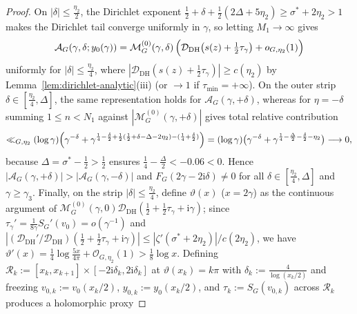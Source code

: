 \documentclass[11pt,a4paper,reqno]{amsart}
\theoremstyle{definition}
\theoremstyle{remark}
\numberwithin{equation}{section}
\newcommand{\ii}{\mathrm{i}}
\begin{document}
\begin{proof}
On $|\delta| \le \frac{\eta_2}{2}$, the Dirichlet exponent $\frac{1}{2} + \delta + \frac{1}{2}(2\Delta + 5\eta_2) \ge \sigma^* + 2\eta_2 > 1$ makes the Dirichlet tail converge uniformly in $\gamma$, so letting $M_1 \to \infty$ gives
\begin{equation*}
  \mathcal{A}_G(\gamma, \delta; y_0(\gamma))
  = \mathcal{M}_G^{(0)}(\gamma, \delta)\,\Bigl(\mathcal{D}_{\mathrm{DH}}\!\left(s(z) + \tfrac{1}{2}\tau_\gamma\right) + o_{G,\eta_2}(1)\Bigr)
\end{equation*}
uniformly for $|\delta| \le \frac{\eta_2}{4}$, where $|\mathcal{D}_{\mathrm{DH}}(s(z) + \frac{1}{2}\tau_\gamma)| \ge c(\eta_2)$ by Lemma~\ref{lem:dirichlet-analytic}(iii) (or $\to 1$ if $\tau_{\min} = +\infty$). On the outer strip $\delta \in [\frac{\eta_2}{4}, \Delta]$, the same representation holds for $\mathcal{A}_G(\gamma, +\delta)$, whereas for $\eta = -\delta$ summing $1 \le n < N_1$ against $|\mathcal{M}_G^{(0)}(\gamma, +\delta)|$ gives total relative contribution
\begin{equation*}
  \ll_{G,\eta_2} (\log\gamma)\Bigl(\gamma^{-\delta} + \gamma^{\frac{1}{4} - \frac{\delta}{2} + \frac{1}{2}(\frac{1}{2} + \delta - \Delta - 2\eta_2) - (\frac{1}{4} + \frac{\delta}{2})}\Bigr)
  = (\log\gamma)\bigl(\gamma^{-\delta} + \gamma^{\frac{1}{4} - \frac{\Delta}{2} - \frac{\delta}{2} - \eta_2}\bigr) \longrightarrow 0,
\end{equation*}
because $\Delta = \sigma^* - \frac{1}{2} > \frac{1}{2}$ ensures $\frac{1}{4} - \frac{\Delta}{2} < -0.06 < 0$. Hence $|\mathcal{A}_G(\gamma, +\delta)| > |\mathcal{A}_G(\gamma, -\delta)|$ and $F_G(2\gamma - 2\ii\delta) \ne 0$ for all $\delta \in [\frac{\eta_2}{4}, \Delta]$ and $\gamma \ge \gamma_3$. Finally, on the strip $|\delta| \le \frac{\eta_2}{4}$, define $\vartheta(x)$ ($x = 2\gamma$) as the continuous argument of $\mathcal{M}_G^{(0)}(\gamma, 0)\mathcal{D}_{\mathrm{DH}}(\frac{1}{2} + \frac{1}{2}\tau_\gamma + \ii\gamma)$; since $\tau_\gamma' = \frac{1}{8\gamma}S_G'(v_0) = o(\gamma^{-1})$ and $|(\mathcal{D}_{\mathrm{DH}}'/\mathcal{D}_{\mathrm{DH}})(\frac{1}{2} + \frac{1}{2}\tau_\gamma + \ii\gamma)| \le |\zeta'(\sigma^* + 2\eta_2)|/c(2\eta_2)$, we have $\vartheta'(x) = \frac{1}{4}\log\frac{5x}{4\pi} + \mathcal{O}_{G,\eta_2}(1) > \frac{1}{8}\log x$. Defining $\mathcal{R}_k := [x_k, x_{k+1}] \times [-2\ii\delta_k, 2\ii\delta_k]$ at $\vartheta(x_k) = k\pi$ with $\delta_k := \frac{4}{\log(x_k/2)}$ and freezing $v_{0,k} := v_0(x_k/2)$, $y_{0,k} := y_0(x_k/2)$, and $\tau_k := S_G(v_{0,k})$ across $\mathcal{R}_k$ produces a holomorphic proxy

\end{proof}
\end{document}
